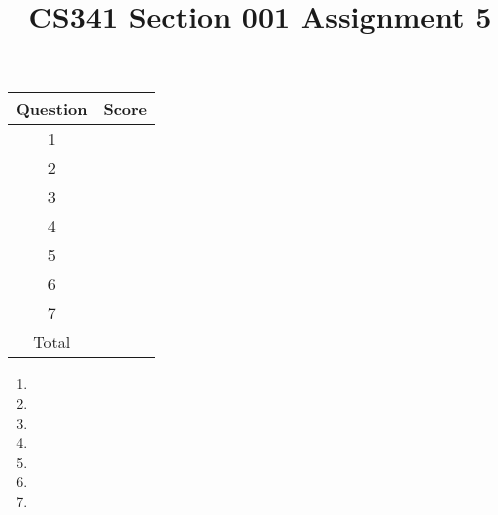 \documentclass[12pt]{article}
\title{CS341 Section 001 Assignment 5}
\begin{document}
\maketitle
\begin{center}
\begin{tabular}{|c|p{3cm}|}
\hline
Question & Score \\ \hline
1& \\ \hline
2& \\ \hline
3& \\ \hline
4& \\ \hline
5& \\ \hline
6& \\ \hline
7& \\ \hline
Total& \\ \hline
\end{tabular}
\clearpage
\end{center}

\begin{enumerate}
\item
\item
\item
\item
\item
\item
\item
\end{enumerate}
\end{document}
